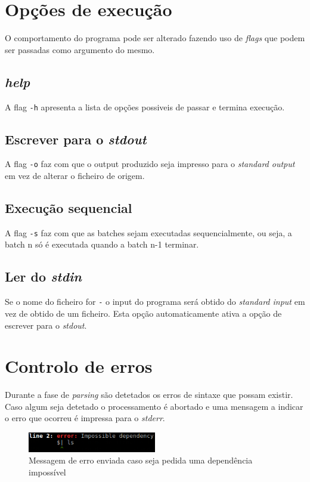 \documentclass[12pt,a4paper]{report}
\begin{document}
\chapter{Opções de execução}
    O comportamento do programa pode ser alterado fazendo uso de \textit{flags}
    que podem ser passadas como argumento do mesmo.
    \section{\textit{help}}
        A flag \texttt{-h} apresenta a lista de opções possiveis
        de passar e termina execução.
    \section{Escrever para o \textit{stdout}}
        A flag \texttt{-o} faz com que o output produzido seja
        impresso para o \textit{standard output} em vez de alterar o ficheiro
        de origem.
    \section{Execução sequencial}
        A flag \texttt{-s} faz com que as batches sejam executadas
        sequencialmente, ou seja, a batch n só é executada quando a batch n-1
        terminar.
    \section{Ler do \textit{stdin}}
        Se o nome do ficheiro for \texttt{-} o input do programa será
        obtido do \textit{standard input} em vez de obtido de um ficheiro. Esta
        opção automaticamente ativa a opção de escrever para o \textit{stdout}.

\chapter{Controlo de erros}
    Durante a fase de \textit{parsing} são detetados os erros de sintaxe que
    possam existir. Caso algum seja detetado o processamento é abortado e uma
    mensagem a indicar o erro que ocorreu é impressa para o \textit{stderr}.

    \begin{figure}[h]
        \centering
        \includegraphics[width=0.5\textwidth]{./images/parseError.png}
        \caption{Messagem de erro enviada caso seja pedida uma dependência
                    impossível}
        \label{fig:parseError}
    \end{figure}
\end{document}
